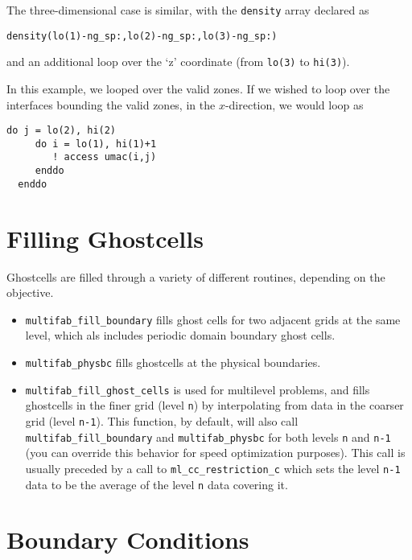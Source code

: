 The three-dimensional case is similar, with the {\tt density} array
declared as 
\begin{lstlisting}[language={[95]fortran},mathescape=false]
  density(lo(1)-ng_sp:,lo(2)-ng_sp:,lo(3)-ng_sp:)
\end{lstlisting}
and an additional loop over the `z' coordinate (from {\tt lo(3)} to
{\tt hi(3)}).

In this example, we looped over the valid zones.  If we wished to loop
over the interfaces bounding the valid zones, in the $x$-direction,
we would loop as
\begin{lstlisting}[language={[95]fortran},mathescape=false]
  do j = lo(2), hi(2)
     do i = lo(1), hi(1)+1
        ! access umac(i,j)
     enddo
  enddo
\end{lstlisting}


\section{Filling Ghostcells}

Ghostcells are filled through a variety of different routines, depending
on the objective.

\begin{itemize}

\item {\tt multifab\_fill\_boundary} fills ghost cells for two
  adjacent grids at the same level, which als includes periodic domain
  boundary ghost cells.

\item {\tt multifab\_physbc} fills ghostcells at the physical boundaries.

\item {\tt multifab\_fill\_ghost\_cells} is used for multilevel
  problems, and fills ghostcells in the finer grid (level {\tt n}) by
  interpolating from data in the coarser grid (level {\tt n-1}).
  This function, by default, will also call {\tt multifab\_fill\_boundary}
  and {\tt multifab\_physbc} for both levels {\tt n} and {\tt n-1} (you 
  can override this behavior for speed optimization purposes).
  This call is usually preceded by a call to 
  {\tt ml\_cc\_restriction\_c} which sets the level {\tt n-1} data to be
  the average of the level {\tt n} data covering it.
   

\end{itemize}

\section{Boundary Conditions}

